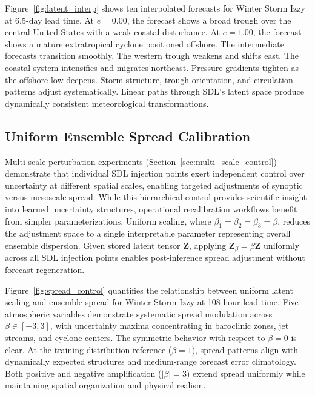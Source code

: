 \documentclass[11pt]{article}
\begin{document}
Figure~\ref{fig:latent_interp} shows ten interpolated forecasts for Winter Storm Izzy at 6.5-day lead time. At $e{=}0.00$, the forecast shows a broad trough over the central United States with a weak coastal disturbance. At $e{=}1.00$, the forecast shows a mature extratropical cyclone positioned offshore. The intermediate forecasts transition smoothly. The western trough weakens and shifts east. The coastal system intensifies and migrates northeast. Pressure gradients tighten as the offshore low deepens. Storm structure, trough orientation, and circulation patterns adjust systematically. Linear paths through SDL's latent space produce dynamically consistent meteorological transformations.

\subsection{Uniform Ensemble Spread Calibration}



Multi-scale perturbation experiments (Section~\ref{sec:multi_scale_control}) demonstrate that individual SDL injection points exert independent control over uncertainty at different spatial scales, enabling targeted adjustments of synoptic versus mesoscale spread. While this hierarchical control provides scientific insight into learned uncertainty structures, operational recalibration workflows benefit from simpler parameterizations. Uniform scaling, where $\beta_1 = \beta_2 = \beta_3 = \beta$, reduces the adjustment space to a single interpretable parameter representing overall ensemble dispersion. Given stored latent tensor $\mathbf{Z}$, applying $\mathbf{Z}_{\beta} = \beta \mathbf{Z}$ uniformly across all SDL injection points enables post-inference spread adjustment without forecast regeneration.

Figure~\ref{fig:spread_control} quantifies the relationship between uniform latent scaling and ensemble spread for Winter Storm Izzy at 108-hour lead time. Five atmospheric variables demonstrate systematic spread modulation across $\beta \in [-3, 3]$, with uncertainty maxima concentrating in baroclinic zones, jet streams, and cyclone centers. The symmetric behavior with respect to $\beta = 0$ is clear. At the training distribution reference ($\beta = 1$), spread patterns align with dynamically expected structures and medium-range forecast error climatology. Both positive and negative amplification ($|\beta| = 3$) extend spread uniformly while maintaining spatial organization and physical realism.
\end{document}
